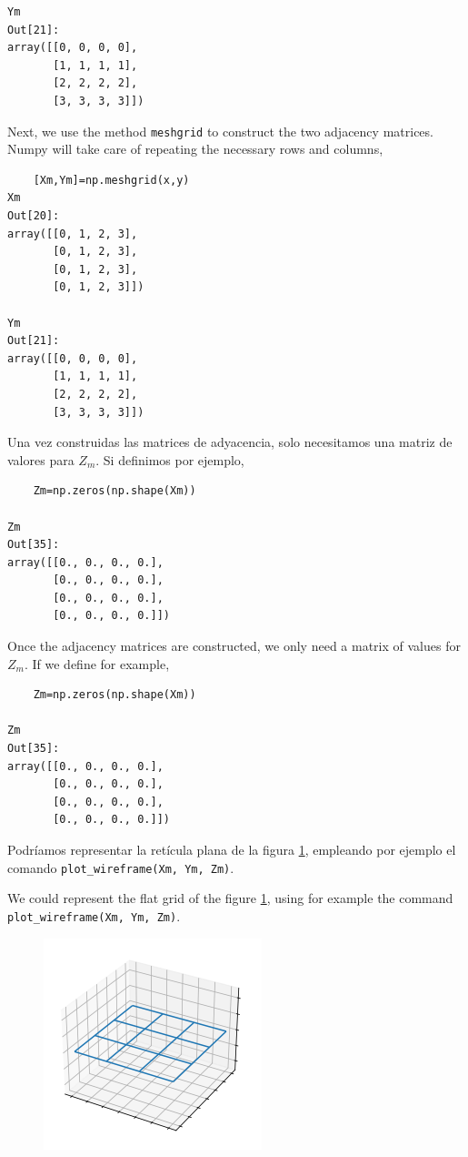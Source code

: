 \begin{paracol}{2}
\begin{verbatim}
Ym
Out[21]: 
array([[0, 0, 0, 0],
       [1, 1, 1, 1],
       [2, 2, 2, 2],
       [3, 3, 3, 3]])
\end{verbatim}


\switchcolumn

Next, we use the method \texttt{meshgrid} to construct the two adjacency matrices. Numpy will take care of repeating the necessary rows and columns,


\begin{verbatim}
    [Xm,Ym]=np.meshgrid(x,y)
Xm
Out[20]: 
array([[0, 1, 2, 3],
       [0, 1, 2, 3],
       [0, 1, 2, 3],
       [0, 1, 2, 3]])

Ym
Out[21]: 
array([[0, 0, 0, 0],
       [1, 1, 1, 1],
       [2, 2, 2, 2],
       [3, 3, 3, 3]])
\end{verbatim}

\switchcolumn    
Una vez construidas las matrices de adyacencia, solo necesitamos una matriz de valores para $Z_m$. Si definimos por ejemplo,


\begin{verbatim}
    Zm=np.zeros(np.shape(Xm))

Zm
Out[35]: 
array([[0., 0., 0., 0.],
       [0., 0., 0., 0.],
       [0., 0., 0., 0.],
       [0., 0., 0., 0.]])
\end{verbatim}

\switchcolumn
Once the adjacency matrices are constructed, we only need a matrix of values for $Z_m$. If we define for example,

\begin{verbatim}
    Zm=np.zeros(np.shape(Xm))

Zm
Out[35]: 
array([[0., 0., 0., 0.],
       [0., 0., 0., 0.],
       [0., 0., 0., 0.],
       [0., 0., 0., 0.]])
\end{verbatim}

\switchcolumn
Podríamos representar la retícula plana de la figura \ref{fig:mesh}, empleando por ejemplo el comando \texttt{plot\_wireframe(Xm, Ym, Zm)}.

\switchcolumn
We could represent the flat grid of the figure \ref{fig:mesh}, using for example the command \texttt{plot\_wireframe(Xm, Ym, Zm)}.

\end{paracol}

\begin{figure}
    \centering
    \includegraphics[width=0.5\linewidth]{figuras/reticula.png}
    \label{fig:mesh}
\end{figure}

